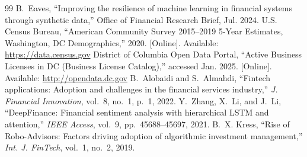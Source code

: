 \documentclass{scrartcl}
\begin{document}
\begin{thebibliography}{99}
 B.~Eaves, “Improving the resilience of machine learning in financial systems through synthetic data,” Office of Financial Research Brief, Jul. 2024.
 U.S. Census Bureau, “American Community Survey 2015–2019 5-Year Estimates, Washington, DC Demographics,” 2020. [Online]. Available: \url{https://data.census.gov}
 District of Columbia Open Data Portal, “Active Business Licenses in DC (Business License Catalog),” accessed Jan. 2025. [Online]. Available: \url{http://opendata.dc.gov}
 B.~Alobaidi and S.~Almahdi, “Fintech applications: Adoption and challenges in the financial services industry,” \textit{J. Financial Innovation}, vol.~8, no.~1, p.~1, 2022.
 Y.~Zhang, X.~Li, and J.~Li, “DeepFinance: Financial sentiment analysis with hierarchical LSTM and attention,” \textit{IEEE Access}, vol.~9, pp.~45688--45697, 2021.
 B.~X. Kress, “Rise of Robo-Advisors: Factors driving adoption of algorithmic investment management,” \textit{Int. J. FinTech}, vol.~1, no.~2, 2019.

\end{thebibliography}
\end{document}
